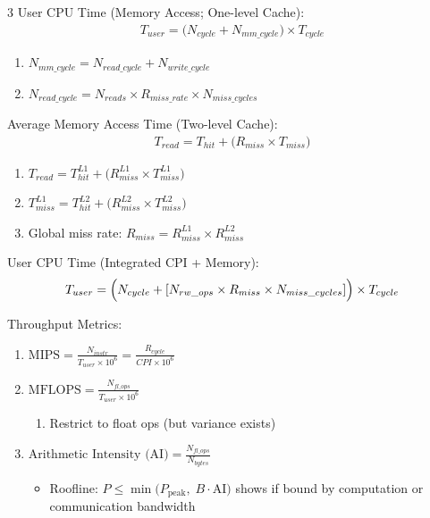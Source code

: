 \documentclass[12pt, a4paper]{article}
\begin{document}
\begin{multicols*}{3}
User CPU Time (Memory Access; One-level Cache):
\begin{gather*}
  T_{user} = \bigl(N_{cycle} + N_{mm\_cycle}\bigr)\times T_{cycle}
\end{gather*}
\begin{enumerate}[\roman*.]
  \item $ N_{mm\_cycle} = N_{read\_cycle} + N_{write\_cycle}$
  \item $ N_{read\_cycle} = N_{reads}\times R_{miss\_rate}\times N_{miss\_cycles}$
\end{enumerate}\vspace{1em}

Average Memory Access Time (Two-level Cache):
\begin{gather*}
  T_{read} = T_{hit} + \bigl(R_{miss}\times T_{miss}\bigr)
\end{gather*}
\begin{enumerate}[\roman*.]
  \item $ T_{read} = T^{L1}_{hit} + \bigl(R^{L1}_{miss}\times T^{L1}_{miss}\bigr)$
  \item $ T^{L1}_{miss} = T^{L2}_{hit} + \bigl(R^{L2}_{miss}\times T^{L2}_{miss}\bigr)$
  \item Global miss rate: $R_{miss} = R^{L1}_{miss}\times R^{L2}_{miss}$
\end{enumerate}\vspace{1em}

User CPU Time (Integrated CPI + Memory):
\begin{gather*}
  T_{user} =
  \Bigl(N_{cycle} + [N_{rw\_ops}\times R_{miss}\times N_{miss\_cycles}]\Bigr)
  \times T_{cycle}
\end{gather*}

Throughput Metrics:
\begin{enumerate}[\roman*.]
  \item $\text{MIPS} = \frac{N_{instr}}{T_{user} \times 10^6} = \frac{R_{cycle}}{CPI \times 10^6}$ 
  \item $\text{MFLOPS} = \frac{N_{fl\_ops}}{T_{user} \times 10^6}$
  \begin{enumerate}[leftmargin=*, label=$+$]\vspace{5pt}
    \item Restrict to float ops (but variance exists)
  \end{enumerate}
  \item $\text{Arithmetic Intensity (AI)} = \frac{N_{fl\_ops}}{N_{bytes}}$
  \begin{itemize}[leftmargin=*, label=$+$]\vspace{3pt}
    \item Roofline: $P \le \min\!\big(P_{\text{peak}},\; B\cdot \text{AI}\big)$ shows if bound by computation or communication bandwidth
  \end{itemize}
\end{enumerate}


\end{multicols*}
\end{document}
